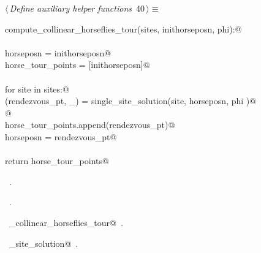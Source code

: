 \documentclass[11.5pt]{report}
\begin{document}

\begin{flushleft} \small
\begin{minipage}{\linewidth}\label{scrap57}\raggedright\small
{} $\langle\,${\itshape Define auxiliary helper functions}\nobreak\ {\footnotesize {40}}$\,\rangle\equiv$
\vspace{-1ex}
\begin{list}{}{} \item
\mbox{}\verb@def compute_collinear_horseflies_tour(sites, inithorseposn, phi):@\\
\mbox{}\verb@@\\
\mbox{}\verb@      horseposn         = inithorseposn@\\
\mbox{}\verb@      horse_tour_points = [inithorseposn]@\\
\mbox{}\verb@@\\
\mbox{}\verb@      for site in sites:@\\
\mbox{}\verb@          (rendezvous_pt, _) = single_site_solution(site, horseposn, phi )@\\
\mbox{}\verb@            @\\
\mbox{}\verb@          horse_tour_points.append(rendezvous_pt)@\\
\mbox{}\verb@          horseposn = rendezvous_pt@\\
\mbox{}\verb@@\\
\mbox{}\verb@      return horse_tour_points@\\
\mbox{}\verb@@{\NWsep}
\end{list}
\vspace{-1.5ex}
\footnotesize
\begin{list}{}{\setlength{\itemsep}{-\parsep}\setlength{\itemindent}{-\leftmargin}}
\item \NWtxtMacroDefBy\ .
\item \NWtxtMacroRefIn\ .
\item \NWtxtIdentsDefed\nobreak\  \verb@compute_collinear_horseflies_tour@\nobreak\ .\item \NWtxtIdentsUsed\nobreak\  \verb@single_site_solution@\nobreak\ .
\item{}
\end{list}
\end{minipage}\vspace{4ex}
\end{flushleft}
\end{document}
